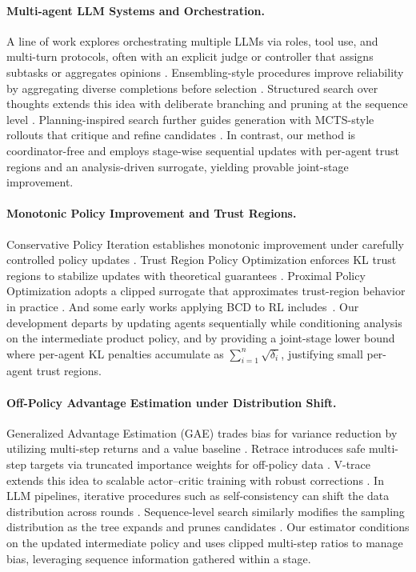 \documentclass[sigconf]{aamas}
\begin{document}
\paragraph{Multi-agent LLM Systems and Orchestration.}
A line of work explores orchestrating multiple LLMs via roles, tool use, and multi-turn protocols, often with an explicit judge or controller that assigns subtasks or aggregates opinions \citep{yao2022react}.
Ensembling-style procedures improve reliability by aggregating diverse completions before selection \citep{wang2023self}.
Structured search over thoughts extends this idea with deliberate branching and pruning at the sequence level \citep{yao2023treeofthoughts}.
Planning-inspired search further guides generation with MCTS-style rollouts that critique and refine candidates \citep{feng2023alphazero, xie2025haer}.
In contrast, our method is coordinator-free and employs stage-wise sequential updates with per-agent trust regions and an analysis-driven surrogate, yielding provable joint-stage improvement.

\paragraph{Monotonic Policy Improvement and Trust Regions.}
Conservative Policy Iteration establishes monotonic improvement under carefully controlled policy updates \citep{kakade2002cpi}.
Trust Region Policy Optimization enforces KL trust regions to stabilize updates with theoretical guarantees \citep{schulman2015trpo}.
Proximal Policy Optimization adopts a clipped surrogate that approximates trust-region behavior in practice \citep{schulman2017proximal}. And some early works applying BCD to RL includes~\citep{zhang2021mean,xie2018block}. 
Our development departs by updating agents sequentially while conditioning analysis on the intermediate product policy, and by providing a joint-stage lower bound where per-agent KL penalties accumulate as \(\sum_{i=1}^{n}\sqrt{\delta_i}\), justifying small per-agent trust regions.

\paragraph{Off-Policy Advantage Estimation under Distribution Shift.}
Generalized Advantage Estimation (GAE) trades bias for variance reduction by utilizing multi-step returns and a value baseline \citep{schulman2016gae, liu2023improving}.
Retrace introduces safe multi-step targets via truncated importance weights for off-policy data \citep{munos2016safe, xie2025acorn}.
V-trace extends this idea to scalable actor–critic training with robust corrections \citep{espeholt2018impala}.
In LLM pipelines, iterative procedures such as self-consistency can shift the data distribution across rounds \citep{wang2023self}.
Sequence-level search similarly modifies the sampling distribution as the tree expands and prunes candidates \citep{yao2023treeofthoughts}.
Our estimator conditions on the updated intermediate policy and uses clipped multi-step ratios to manage bias, leveraging sequence information gathered within a stage.
\end{document}
